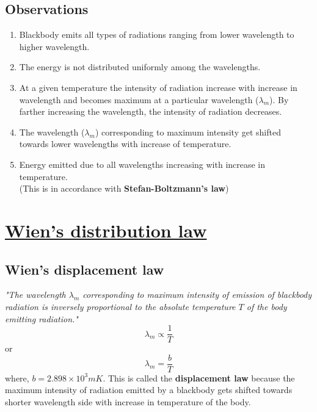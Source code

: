 \documentclass[16pt,a4paper]{article}
\begin{document}
\subsection{\textbf{Observations}}
\begin{enumerate}
    \item Blackbody emits all types of radiations ranging from lower wavelength to higher wavelength.
    \item The energy is not distributed uniformly among the wavelengths.
    \item At a given temperature the intensity of radiation increase with increase in wavelength and becomes maximum at a particular wavelength ($\lambda_{m}$). By farther increasing the wavelength, the intensity of radiation decreases.
    \item The wavelength ($\lambda_{m}$) corresponding to maximum intensity get shifted towards lower wavelengths with increase of temperature.
    \item Energy emitted due to all wavelengths increasing with increase in temperature.\\
    (This is in accordance with \textbf{Stefan-Boltzmann's law})
\end{enumerate}
\newpage
\section{\underline{Wien's distribution law}}
    \subsection{\textbf{Wien's displacement law}} \textit{"The wavelength $\lambda_{m}$ corresponding to maximum intensity of emission of blackbody radiation is inversely proportional to the absolute temperature $T$ of the body emitting radiation."}
    \begin{equation*}
        \lambda_{m} \propto \frac{1}{T}
    \end{equation*}
    or
    \begin{equation}
        \lambda_{m} = \frac{b}{T}
    \end{equation}
    where,  $b = 2.898 \times 10^{3} mK$.
This is called the \textbf{displacement law} because the maximum intensity of radiation emitted by a blackbody gets shifted towards shorter wavelength side with increase in temperature of the body.
\end{document}
